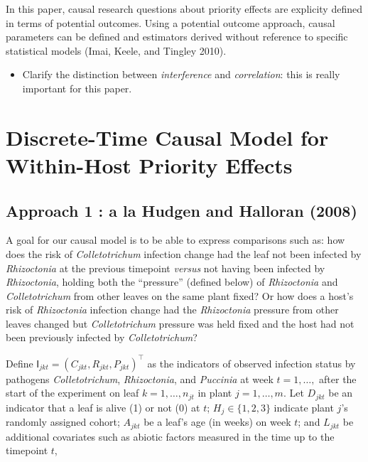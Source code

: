 \documentclass[]{article}
\providecommand{\tightlist}{%
  \setlength{\itemsep}{0pt}\setlength{\parskip}{0pt}}
\begin{document}
In this paper, causal research questions about priority effects are
explicity defined in terms of potential outcomes. Using a potential
outcome approach, causal parameters can be defined and estimators
derived without reference to specific statistical models (Imai, Keele,
and Tingley 2010).

\begin{itemize}
\tightlist
\item
  Clarify the distinction between \emph{interference} and
  \emph{correlation}: this is really important for this paper.
\end{itemize}

\hypertarget{causal_model}{%
\section{Discrete-Time Causal Model for Within-Host Priority
Effects}\label{causal_model}}

\hypertarget{approach-1-a-la-hudgen-and-halloran-2008}{%
\subsection{Approach 1 : a la Hudgen and Halloran
(2008)}\label{approach-1-a-la-hudgen-and-halloran-2008}}

A goal for our causal model is to be able to express comparisons such
as: how does the risk of \emph{Colletotrichum} infection change had the
leaf not been infected by \emph{Rhizoctonia} at the previous timepoint
\emph{versus} not having been infected by \emph{Rhizoctonia}, holding
both the ``pressure'' (defined below) of \emph{Rhizoctonia} and
\emph{Colletotrichum} from other leaves on the same plant fixed? Or how
does a host's risk of \emph{Rhizoctonia} infection change had the
\emph{Rhizoctonia} pressure from other leaves changed but
\emph{Colletotrichum} pressure was held fixed and the host had not been
previously infected by \emph{Colletotrichum}?

Define \(\mathsf{I}_{jkt} = (C_{jkt}, R_{jkt}, P_{jkt})^\intercal\) as
the indicators of observed infection status by pathogens
\emph{Colletotrichum}, \emph{Rhizoctonia}, and \emph{Puccinia} at week
\(t = 1, \dots,\) after the start of the experiment on leaf
\(k = 1, \dots, n_{jt}\) in plant \(j = 1, \dots, m\). Let \(D_{jkt}\)
be an indicator that a leaf is alive (1) or not (0) at \(t\);
\(H_{j} \in \{1, 2, 3\}\) indicate plant \(j\)'s randomly assigned
cohort; \(A_{jkt}\) be a leaf's age (in weeks) on week \(t\); and
\(L_{jkt}\) be additional covariates such as abiotic factors measured in
the time up to the timepoint \(t\),
\end{document}
